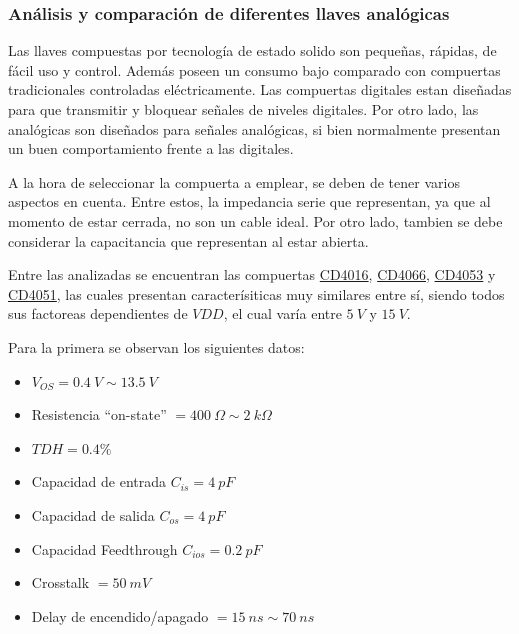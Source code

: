 \subsubsection{Análisis y comparación de diferentes llaves analógicas}
Las llaves compuestas por tecnología de estado solido son pequeñas, rápidas, de fácil uso y control. Además poseen un consumo bajo comparado con compuertas tradicionales controladas eléctricamente. Las compuertas digitales estan diseñadas para que transmitir y bloquear señales de niveles digitales. Por otro lado, las analógicas son diseñados para señales analógicas, si bien normalmente presentan un buen comportamiento frente a las digitales.

A la hora de seleccionar la compuerta a emplear, se deben de tener varios aspectos en cuenta. Entre estos, la impedancia serie que representan, ya que al momento de estar cerrada, no son un cable ideal. Por otro lado, tambien se debe considerar la capacitancia que representan al estar abierta.

Entre las analizadas se encuentran las compuertas \href{http://www.ti.com/lit/ds/symlink/cd4016b.pdf}{CD4016}, \href{http://www.ti.com/lit/ds/symlink/cd4066b.pdf}{CD4066}, \href{http://www.ti.com/lit/ds/symlink/cd4051b.pdf}{CD4053} y \href{http://www.ti.com/lit/ds/symlink/cd4051b.pdf}{CD4051}, las cuales presentan caracterísiticas muy similares entre sí, siendo todos sus factoreas dependientes de $VDD$, el cual varía entre $5 \ V$ y $15 \ V$.

Para la primera se observan los siguientes datos:
\begin{multicols}{2}
\begin{itemize}
	\item $V_{OS} = 0.4 \ V \sim 13.5 \ V$
	\item Resistencia ``on-state'' $= 400 \ \Omega \sim 2 \ k\Omega$
	\item $TDH = 0.4\%$
	\item Capacidad de entrada $C_{is} = 4 \ pF$
	\item Capacidad de salida $C_{os} = 4 \ pF$
	\item Capacidad Feedthrough $C_{ios} = 0.2 \ pF$
	\item Crosstalk $= 50 \ mV$
	\item Delay de encendido/apagado $= 15 \ ns \sim 70 \ ns$
\end{itemize}
\end{multicols}

